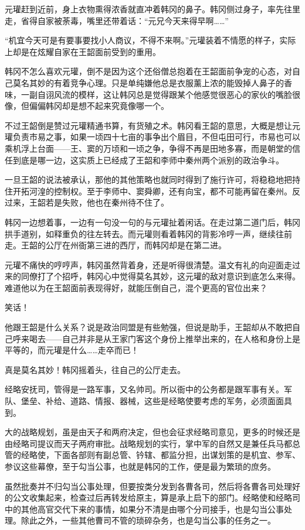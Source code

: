 元瓘赶到近前，身上衣物熏得浓香就直冲着韩冈的鼻子。韩冈侧过身子，率先往里走，省得自家被荼毒，嘴里还带着话：“元兄今天来得早啊……”

“机宜今天可是有要事要找小人商议，不得不来啊。”元瓘装着不情愿的样子，实际上却是在炫耀自家在王韶面前受到的重用。

韩冈不怎么喜欢元瓘，倒不是因为这个还俗僧总抱着在王韶面前争宠的心态，对自己莫名其妙的有着竞争心理。只是单纯嫌他总是衣服薰上浓的能毁掉人鼻子的香味，一副自诩风流的模样，这让韩冈总是觉得跟某个他感觉很恶心的家伙的嘴脸很像，但偏偏韩冈却是想不起来究竟像哪一个。

不过王韶倒是赞过元瓘精通书算，有货殖之术。韩冈看王韶的意思，大概是想让元瓘负责市易之事，如果一顷四十七亩的事争出个眉目，不但屯田可行，市易也可以乘机浮上台面——王、窦的万顷和一顷之争，争得不再是田地多寡，而是朝堂的信任到底是哪一边，这实质上已经成了王韶和李师中秦州两个派别的政治争斗。

一旦王韶的说法被承认，那他的其他策略也就同时得到了施行许可，将稳稳地把持住开拓河湟的控制权。至于李师中、窦舜卿，还有向宝，都不可能再留在秦州。反过来，王韶若是失败，他也在秦州待不住了。

韩冈一边想着事，一边有一句没一句的与元瓘扯着闲话。在走过第二道门后，韩冈拱手道别，如释重负的往左转去。而元瓘则看着韩冈的背影冷哼一声，继续往前走。王韶的公厅在州衙第三进的西厅，而韩冈却是在第二进。

元瓘不痛快的哼哼声，韩冈虽然背着身，还是听得很清楚。温文有礼的向迎面走过来的同僚打了个招呼，韩冈心中觉得莫名其妙，这元瓘的敌对意识到底怎么来得。难道他以为在王韶面前表现得好，就能压倒自己，混个更高的官位出来？

笑话！

他跟王韶是什么关系？说是政治同盟是有些勉强，但说是助手，王韶却从不敢把自己呼来喝去——自己并非是从王家门客这个身份上推举出来的，在人格和身份上是平等的，而元瓘是什么……走卒而已！

真是莫名其妙！韩冈摇着头，往自己的公厅走去。

经略安抚司，管得是一路军事，又名帅司。所以衙中的公务都是跟军事有关。军队、堡垒、补给、道路、情报、器械，这些是经略使要考虑的军务，必须面面具到。

大的战略规划，虽是由天子和两府决定，但也会征求经略司意见，更多的时候还是由经略司提议而天子两府审批。战略规划的实行，掌中军的自然又是兼任兵马都总管的经略使，下面各部则有副总管、钤辖、都监分担，出谋划策的是机宜、参军、参议这些幕僚，至于勾当公事，也就是韩冈的工作，便是最为繁琐的庶务。

虽然批奏并不归勾当公事处理，但要按类分发到各曹各司，然后将各曹各司处理好的公文收集起来，检查过后再转发给原主，算是承上启下的部门。经略使和经略司中的其他高官交代下来的事情，如果分不清是由哪个分司接手，也是勾当公事处理。除此之外，一些其他曹司不管的琐碎杂务，也是勾当公事的任务之一。

